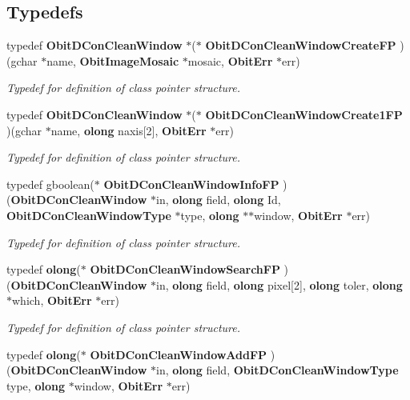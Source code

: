 \subsection*{Typedefs}
\begin{CompactItemize}
\item 
typedef {\bf Obit\-DCon\-Clean\-Window} $\ast$($\ast$ {\bf Obit\-DCon\-Clean\-Window\-Create\-FP} )(gchar $\ast$name, {\bf Obit\-Image\-Mosaic} $\ast$mosaic, {\bf Obit\-Err} $\ast$err)
\begin{CompactList}\small\item\em Typedef for definition of class pointer structure. \item\end{CompactList}\item 
typedef {\bf Obit\-DCon\-Clean\-Window} $\ast$($\ast$ {\bf Obit\-DCon\-Clean\-Window\-Create1FP} )(gchar $\ast$name, {\bf olong} naxis[2], {\bf Obit\-Err} $\ast$err)
\begin{CompactList}\small\item\em Typedef for definition of class pointer structure. \item\end{CompactList}\item 
typedef gboolean($\ast$ {\bf Obit\-DCon\-Clean\-Window\-Info\-FP} )({\bf Obit\-DCon\-Clean\-Window} $\ast$in, {\bf olong} field, {\bf olong} Id, {\bf Obit\-DCon\-Clean\-Window\-Type} $\ast$type, {\bf olong} $\ast$$\ast$window, {\bf Obit\-Err} $\ast$err)
\begin{CompactList}\small\item\em Typedef for definition of class pointer structure. \item\end{CompactList}\item 
typedef {\bf olong}($\ast$ {\bf Obit\-DCon\-Clean\-Window\-Search\-FP} )({\bf Obit\-DCon\-Clean\-Window} $\ast$in, {\bf olong} field, {\bf olong} pixel[2], {\bf olong} toler, {\bf olong} $\ast$which, {\bf Obit\-Err} $\ast$err)
\begin{CompactList}\small\item\em Typedef for definition of class pointer structure. \item\end{CompactList}\item 
typedef {\bf olong}($\ast$ {\bf Obit\-DCon\-Clean\-Window\-Add\-FP} )({\bf Obit\-DCon\-Clean\-Window} $\ast$in, {\bf olong} field, {\bf Obit\-DCon\-Clean\-Window\-Type} type, {\bf olong} $\ast$window, {\bf Obit\-Err} $\ast$err)
$$
\end{CompactItemize}
